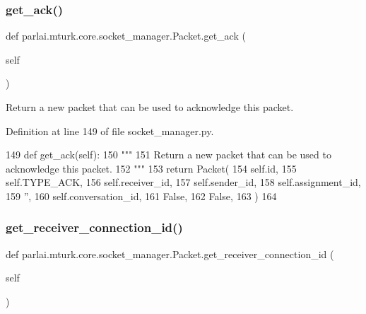 \subsubsection{\texorpdfstring{get\+\_\+ack()}{get\_ack()}}
{\footnotesize\ttfamily def parlai.\+mturk.\+core.\+socket\+\_\+manager.\+Packet.\+get\+\_\+ack (\begin{DoxyParamCaption}\item[{}]{self }\end{DoxyParamCaption})}

\begin{DoxyVerb}Return a new packet that can be used to acknowledge this packet.
\end{DoxyVerb}
 

Definition at line 149 of file socket\+\_\+manager.\+py.


\begin{DoxyCode}
149     \textcolor{keyword}{def }get\_ack(self):
150         \textcolor{stringliteral}{"""}
151 \textcolor{stringliteral}{        Return a new packet that can be used to acknowledge this packet.}
152 \textcolor{stringliteral}{        """}
153         \textcolor{keywordflow}{return} Packet(
154             self.id,
155             self.TYPE\_ACK,
156             self.receiver\_id,
157             self.sender\_id,
158             self.assignment\_id,
159             \textcolor{stringliteral}{''},
160             self.conversation\_id,
161             \textcolor{keyword}{False},
162             \textcolor{keyword}{False},
163         )
164 
\end{DoxyCode}
\mbox{\label{classparlai_1_1mturk_1_1core_1_1socket__manager_1_1Packet_af13faca81d70ad1768e6dd0089c8e082}} 
\subsubsection{\texorpdfstring{get\+\_\+receiver\+\_\+connection\+\_\+id()}{get\_receiver\_connection\_id()}}
{\footnotesize\ttfamily def parlai.\+mturk.\+core.\+socket\+\_\+manager.\+Packet.\+get\+\_\+receiver\+\_\+connection\+\_\+id (\begin{DoxyParamCaption}\item[{}]{self }\end{DoxyParamCaption})}

